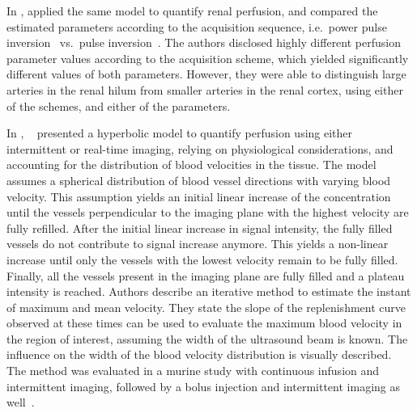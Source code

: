 In \citeyear{Schlosser:2001vv}, \citet{Schlosser:2001vv} applied the same model to quantify renal perfusion, %
and compared the estimated parameters according to the acquisition sequence, i.e.~power pulse inversion~\cite{Simpson:1997jn} vs.~pulse inversion~\cite{Burns:2000tl}. %
The authors disclosed highly different perfusion parameter values according to the acquisition scheme, which yielded significantly different values of both parameters.
However, they were able to distinguish large arteries in the renal hilum from smaller arteries in the renal cortex, using either of the schemes, and either of the parameters.

In \citeyear{Krix:2003tq}, ~\citet{Krix:2003tq} presented a hyperbolic model to quantify perfusion using either intermittent or real-time imaging, relying on physiological considerations, and accounting for the distribution of blood velocities in the tissue. %
The model assumes a spherical distribution of blood vessel directions with varying blood velocity.
This assumption yields an initial linear increase of the concentration until the vessels perpendicular to the imaging plane with the highest velocity are fully refilled. 
After the initial linear increase in signal intensity, the fully filled vessels do not contribute to signal increase anymore. This yields a non-linear increase until only the vessels with the lowest velocity remain to be fully filled. 
Finally, all the vessels present in the imaging plane are fully filled and a plateau intensity is reached. 
Authors describe an iterative method to estimate the instant of maximum and mean velocity.
They state the slope of the replenishment curve observed at these times can be used to evaluate the maximum blood velocity in the region of interest, assuming the width of the ultrasound beam is known.
The influence on the width of the blood velocity distribution is visually described.
The method was evaluated in a murine study with continuous infusion and intermittent imaging, followed by a bolus injection and intermittent imaging as well~\cite{Krix:2003wh}. %

